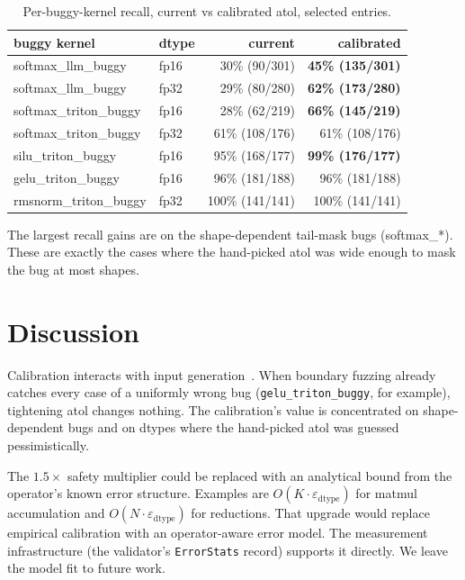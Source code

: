 \documentclass[runningheads]{llncs}
\begin{document}
\begin{table}[h]
\centering
\caption{Per-buggy-kernel recall, current vs calibrated atol, selected
entries.}
\label{tab:recall}
\begin{tabular}{llrr}
\toprule
buggy kernel & dtype & current & \textbf{calibrated} \\
\midrule
softmax\_llm\_buggy     & fp16 & 30\% (90/301)  & \textbf{45\% (135/301)} \\
softmax\_llm\_buggy     & fp32 & 29\% (80/280)  & \textbf{62\% (173/280)} \\
softmax\_triton\_buggy  & fp16 & 28\% (62/219)  & \textbf{66\% (145/219)} \\
softmax\_triton\_buggy  & fp32 & 61\% (108/176) & 61\% (108/176) \\
silu\_triton\_buggy     & fp16 & 95\% (168/177) & \textbf{99\% (176/177)} \\
gelu\_triton\_buggy     & fp16 & 96\% (181/188) & 96\% (181/188) \\
rmsnorm\_triton\_buggy  & fp32 & 100\% (141/141) & 100\% (141/141) \\
\bottomrule
\end{tabular}
\end{table}

The largest recall gains are on the shape-dependent tail-mask bugs
(softmax\_*). These are exactly the cases where the hand-picked atol
was wide enough to mask the bug at most shapes.

\section{Discussion}
\label{sec:discussion}

Calibration interacts with input generation~\cite{gpuemuP3}. When
boundary fuzzing already catches every case of a uniformly wrong bug
(\texttt{gelu\_triton\_buggy}, for example), tightening atol changes
nothing. The calibration's value is concentrated on shape-dependent
bugs and on dtypes where the hand-picked atol was guessed
pessimistically.

The $1.5\times$ safety multiplier could be replaced with an
analytical bound from the operator's known error structure. Examples
are $O(K \cdot \varepsilon_{\text{dtype}})$ for matmul accumulation
and $O(N \cdot \varepsilon_{\text{dtype}})$ for reductions. That
upgrade would replace empirical calibration with an operator-aware
error model. The measurement infrastructure (the validator's
\texttt{ErrorStats} record) supports it directly. We leave the model
fit to future work.
\end{document}
